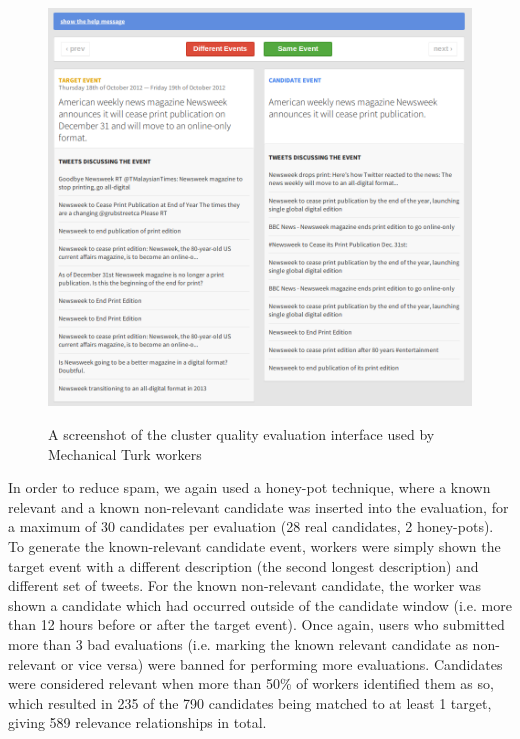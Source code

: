 \begin{figure}[t]
	{\includegraphics[width=\textwidth]{./Chapters/Collection/images/cluster_eval}}
	\caption{A screenshot of the cluster quality evaluation interface used by Mechanical Turk workers}
	\label{fig:clusteringscreenshot}
\end{figure}

In order to reduce spam, we again used a honey-pot technique, where a known relevant and a known non-relevant candidate was inserted into the evaluation, for a maximum of 30 candidates per evaluation (28 real candidates, 2 honey-pots).
To generate the known-relevant candidate event, workers were simply shown the target event with a different description (the second longest description) and different set of tweets.
For the known non-relevant candidate, the worker was shown a candidate which had occurred outside of the candidate window (i.e. more than 12 hours before or after the target event).
Once again, users who submitted more than 3 bad evaluations (i.e. marking the known relevant candidate as non-relevant or vice versa) were banned for performing more evaluations.
Candidates were considered relevant when more than 50\% of workers identified them as so, which resulted in 235 of the 790 candidates being matched to at least 1 target, giving 589 relevance relationships in total.